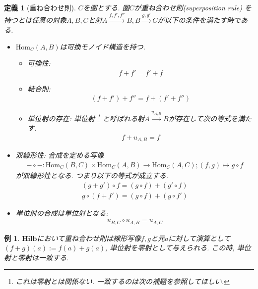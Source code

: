 \documentclass[a4paper,12pt]{ltjsarticle}
\theoremstyle{break}
\newtheorem{defn}[thm]{定義}
\newtheorem{eg}[thm]{例}
\newcommand{\hilb}{\mathbf{Hilb}}
\newcommand{\Hom}{\mathrm{Hom}}
\newcommand{\xr}[1]{\xrightarrow{#1}}
\newcommand{\ci}{\circ}
\newcommand{\ti}{\times}
\numberwithin{equation}{section}
\begin{document}
\begin{defn}[重ね合わせ則]
  $C$を圏とする. 
  圏$C$が重ね合わせ則(superposition rule)
  を持つとは任意の対象$A,B,C$と射$A \xr{f,f',f''} B, B \xr{g,g'} C$が以下の条件を満たす時である.   
  \begin{itemize}
  \item $\Hom_C(A,B)$は可換モノイド構造を持つ. 
  \begin{itemize}
    \item 可換性: \begin{align*} f+f'=f'+f \end{align*}
    \item 結合則: \begin{align*} (f+f')+f''=f+(f'+f'') \end{align*}
    \item 単位射の存在: 単位射
    \footnote{
      これは零射とは関係ない. 一致するのは次の補題を参照してほしい. 
      }
    と呼ばれる射$A \xr{u_{A,B}} B$が存在して次の等式を満たす. 
    \begin{align*} f+u_{A,B}=f \end{align*}
  \end{itemize}
  \item 双線形性: 合成を定める写像
    \begin{align*} - \ci -: \Hom_C(B,C) \ti \Hom_C(A,B) \to \Hom_C(A,C); (f,g) \mapsto g \ci f \end{align*}
    が双線形性となる. つまり以下の等式が成立する. 
    \begin{align*}(g+g') \ci f=(g \ci f)+(g' \ci f) \\ g \ci (f+f')=(g \ci f)+(g \ci f') \end{align*}
  \item 単位射の合成は単位射となる: 
    \begin{align*} u_{B,C} \ci u_{A,B} = u_{A,C} \end{align*}
\end{itemize}
\end{defn}  

\begin{eg}
  $\hilb$において重ね合わせ則は線形写像$f,g$と元$a$に対して演算として$(f+g)(a):=f(a)+g(a)$, 単位射を零射として与えられる.  
  この時, 単位射と零射は一致する. 
\end{eg}  

\end{document}

